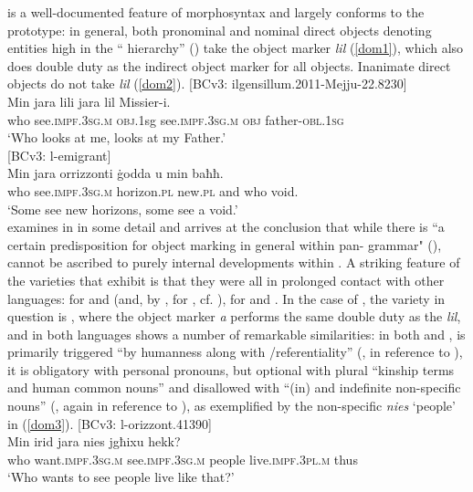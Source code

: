 \documentclass[output=paper]{langsci/langscibook}
\begin{document}
 is a well-documented feature of  morphosyntax and largely conforms to the  prototype: in general, both pronominal and nominal direct objects denoting entities high in the `` hierarchy'' (\citealt[55]{BorgAzzopardi-Alexander1997}) take the object marker \textit{lil} (\ref{dom1}), which also does double duty as the indirect object marker for all objects. Inanimate direct objects do not take \textit{lil} (\ref{dom2}).
\ea\label{dom1}
{[BCv3: ilgensillum.2011-Mejju-22.8230]}\\
\gll Min jara lili jara lil Missier-i.\\
	who see.\textsc{impf.3sg.m} \textsc{obj}.1sg see.\textsc{impf.3sg.m} \textsc{obj} father-\textsc{obl.1sg}\\
	\glt `Who looks at me, looks at my Father.'\\
\z
\ea\label{dom2}
{[BCv3: l-emigrant]}\\
\gll Min jara orrizzonti ġodda u min baħħ.\\
	who see.\textsc{impf.3sg.m} horizon.\textsc{pl} new.\textsc{pl} and who void.\\
	\glt `Some see new horizons, some see a void.'\\
\z
 \cite{dohla2016} examines  in  in some detail and arrives at the conclusion that while there is ``a certain predisposition for object marking in general within pan- grammar" (\citeyear[169]{dohla2016}),   cannot be ascribed to purely internal developments within . A striking feature of the  varieties that exhibit  is that they were all in prolonged contact with other languages:  for  and   (and, by , for  , cf. \citealt[412]{Borg2004}),  for   and . In the case of , the  variety in question is , where the object marker \textit{a} performs the same double duty as the  \textit{lil}, and  in both languages shows a number of remarkable similarities: in both  and ,  is primarily triggered ``by humanness along with /referentiality'' (\citealt[257]{iemmolo2010}, in reference to ), it is obligatory with personal pronouns, but optional with plural ``kinship terms and human common nouns'' and disallowed with ``(in) and indefinite non-specific nouns'' (\citealt[257]{iemmolo2010}, again in reference to ), as exemplified by the non-specific  \textit{nies} `people' in (\ref{dom3}).
\ea\label{dom3}
{[BCv3: l-orizzont.41390]}\\
\gll Min irid jara nies jgħixu hekk?\\
	who want.\textsc{impf.3sg.m} see.\textsc{impf.3sg.m} people live.\textsc{impf.3pl.m} thus\\
	\glt `Who wants to see people live like that?'\\
\z
\end{document}
